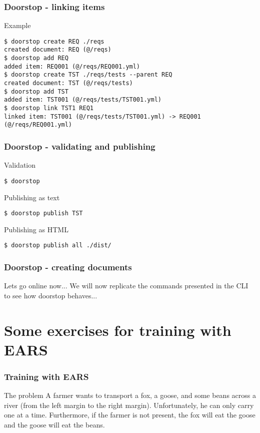 \documentclass[aspectratio=169]{beamer}
\begin{document}
\begin{frame}[fragile]
  \frametitle{Doorstop - linking items}
  \begin{block}{Example}
   \begin{verbatim}
$ doorstop create REQ ./reqs
created document: REQ (@/reqs)
$ doorstop add REQ
added item: REQ001 (@/reqs/REQ001.yml)
$ doorstop create TST ./reqs/tests --parent REQ
created document: TST (@/reqs/tests)
$ doorstop add TST
added item: TST001 (@/reqs/tests/TST001.yml)
$ doorstop link TST1 REQ1
linked item: TST001 (@/reqs/tests/TST001.yml) -> REQ001 (@/reqs/REQ001.yml)
   \end{verbatim}
   \end{block}
\end{frame}

\begin{frame}[fragile]
  \frametitle{Doorstop - validating and publishing}
 \begin{block}{Validation}
   \begin{verbatim}
$ doorstop
   \end{verbatim}
   \end{block}
 \begin{block}{Publishing as text}
   \begin{verbatim}
$ doorstop publish TST
   \end{verbatim}
   \end{block}
 \begin{block}{Publishing as HTML}
   \begin{verbatim}
$ doorstop publish all ./dist/
   \end{verbatim}
   \end{block}
\end{frame}

\begin{frame}
  \frametitle{Doorstop - creating documents}
  \begin{block}{Lets go online now...}
  We will now replicate the commands presented in the CLI to see how doorstop behaves...
  \end{block}
\end{frame}

\section*{Some exercises for training with EARS}

\begin{frame}
  \frametitle{Training with EARS}
  \begin{block}{The problem}  
  A farmer wants to transport a fox, a goose, and some beans across a river (from the left margin to
the right margin). Unfortunately, he can only carry one at a time. Furthermore, if the farmer is not
present, the fox will eat the goose and the goose will eat the beans.  
  \end{block}
\end{frame}
\end{document}
